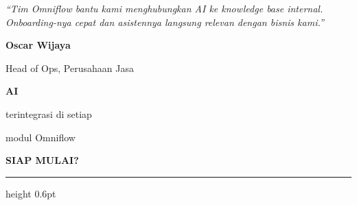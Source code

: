 \documentclass[a4paper]{article}
\newcommand{\sectiontitle}[1]{%
    \vspace{10pt}%
    {\fontsize{13}{16}\selectfont\bfseries\color{BlueDark} #1}\par\vspace{3pt}%
    {\color{BluePrimary}\hrule height 0.6pt}\par\vspace{8pt}%
}
\begin{document}
\noindent
\begin{minipage}[t]{0.485\textwidth}
    \colorbox{BlueBg}{%
        \begin{minipage}{\dimexpr\linewidth-2\fboxsep\relax}
            {\fontsize{9.5}{13}\selectfont\color{TextDark}\textit{``Tim Omniflow bantu kami menghubungkan AI ke knowledge base internal. Onboarding-nya cepat dan asistennya langsung relevan dengan bisnis kami.''}}\par\vspace{4pt}
            {\fontsize{8.5}{11}\selectfont\bfseries\color{BluePrimary} Oscar Wijaya}\par
            {\fontsize{8}{10}\selectfont\color{TextLight} Head of Ops, Perusahaan Jasa}
        \end{minipage}}
\end{minipage}%
\hfill
\begin{minipage}[t]{0.485\textwidth}
    \colorbox{BlueBg}{%
        \begin{minipage}{\dimexpr\linewidth-2\fboxsep\relax}
            \begin{center}
                {\fontsize{20}{24}\selectfont\bfseries\color{BluePrimary} AI}\par
                {\fontsize{9.5}{12}\selectfont\color{TextDark} terintegrasi di setiap}\par
                {\fontsize{9.5}{12}\selectfont\color{TextDark} modul Omniflow}
            \end{center}
        \end{minipage}}
\end{minipage}

\sectiontitle{SIAP MULAI?}
\end{document}
